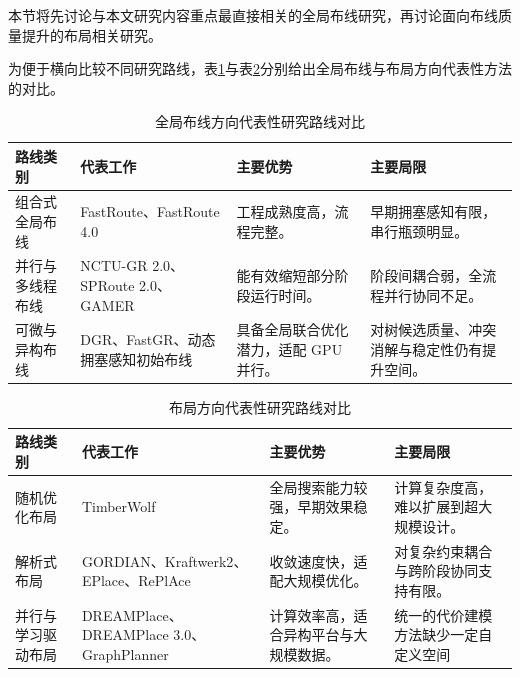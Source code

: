 本节将先讨论与本文研究内容重点最直接相关的全局布线研究，再讨论面向布线质量提升的布局相关研究。

为便于横向比较不同研究路线，表\ref{tab:routing_compare}与表\ref{tab:placement_compare}分别给出全局布线与布局方向代表性方法的对比。

\begin{table}[htbp]
	\centering
	\caption{全局布线方向代表性研究路线对比}
	\label{tab:routing_compare}
	\begin{tabular}{p{}p{}p{}p{}}
		\toprule
		路线类别 & 代表工作 & 主要优势 & 主要局限 \\
		\midrule
		组合式全局布线 & FastRoute\cite{10.1145/1233501.1233596}、FastRoute 4.0\cite{10.5555/1509633.1509768} & 工程成熟度高，流程完整。 & 早期拥塞感知有限，串行瓶颈明显。 \\
		\midrule
		并行与多线程布线 & NCTU-GR 2.0\cite{Liu2013NCTUGR2M}、SPRoute 2.0\cite{10.1109/ASP-DAC52403.2022.9712557}、GAMER\cite{9643563} & 能有效缩短部分阶段运行时间。 & 阶段间耦合弱，全流程并行协同不足。 \\
		\midrule
		可微与异构布线 & DGR\cite{10.1145/3649329.3656530}、FastGR\cite{10.24963/ijcai.2023/720}、动态拥塞感知初始布线\cite{11017940} & 具备全局联合优化潜力，适配 GPU 并行。 & 对树候选质量、冲突消解与稳定性仍有提升空间。 \\
		\bottomrule
	\end{tabular}
\end{table}

\begin{table}[htbp]
	\centering
	\caption{布局方向代表性研究路线对比}
	\label{tab:placement_compare}
	\begin{tabular}{p{}p{}p{}p{}}
		\toprule
		路线类别 & 代表工作 & 主要优势 & 主要局限 \\
		\midrule
		随机优化布局 & TimberWolf\cite{1586125} & 全局搜索能力较强，早期效果稳定。 & 计算复杂度高，难以扩展到超大规模设计。 \\
		\midrule
		解析式布局 & GORDIAN\cite{Kleinhans1991GORDIANVP}、Kraftwerk2\cite{10.1109/TCAD.2008.925783}、EPlace\cite{10.1145/2699873}、RePlAce\cite{10.1109/TCAD.2018.2859220} & 收敛速度快，适配大规模优化。 & 对复杂约束耦合与跨阶段协同支持有限。 \\
		\midrule
		并行与学习驱动布局 & DREAMPlace\cite{9122053}、DREAMPlace 3.0\cite{9256736}、GraphPlanner\cite{10.1145/3555804} & 计算效率高，适合异构平台与大规模数据。 & 统一的代价建模方法缺少一定自定义空间 \\
		\bottomrule
	\end{tabular}
\end{table}

